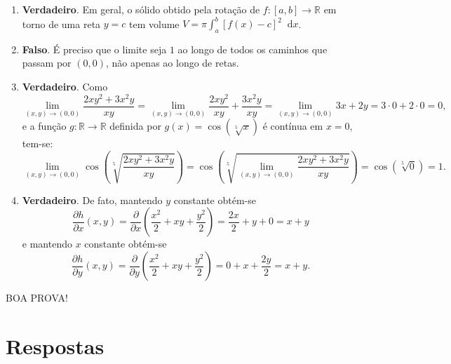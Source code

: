 \documentclass[12pt,a4paper]{article}
\newcommand*\diff{\mathop{}\!\mathrm{d}}
\begin{document}
\begin{ExerciseList}
\Answer \begin{enumerate}
\item \textbf{Verdadeiro}. Em geral, o sólido obtido pela rotação de $f:[a,b]\to\mathbb{R}$ em torno de uma reta $y = c$ tem volume $V = \pi \int_a^b \left[f(x)-c\right]^2 \diff{x}$.
\item \textbf{Falso}. É preciso que o limite seja $1$ ao longo de todos os caminhos que passam por $(0, 0)$, não apenas ao longo de retas.
\item \textbf{Verdadeiro}. Como
\[
\lim_{(x, y)\to(0, 0)} \frac{2xy^2 + 3x^2y}{xy}
= \lim_{(x, y)\to(0, 0)} \frac{2xy^2}{xy} + \frac{3x^2y}{xy}
= \lim_{(x, y)\to(0, 0)} 3x + 2y
= 3 \cdot 0 + 2 \cdot 0
= 0,
\]
e a função $g:\mathbb{R} \to \mathbb{R}$ definida por $g(x) = \cos\left(\sqrt[5]{x}\right)$ é contínua em $x = 0$, tem-se:
\[
\lim_{(x,y)\to(0,0)} \cos\left(\sqrt[5]{\frac{2xy^2+3x^2y}{xy}}\right)
= \cos\left(\sqrt[5]{ \lim_{(x,y)\to(0,0)} \frac{2xy^2+3x^2y}{xy}}\right)
= \cos\left(\sqrt[5]{0}\right)
= 1.
\]
\item \textbf{Verdadeiro}. De fato, mantendo $y$ constante obtém-se
\[
\frac{\partial h}{\partial x}(x, y)
= \frac{\partial}{\partial x}\left( \frac{x^2}{2} + xy + \frac{y^2}{2} \right)
= \frac{2x}{2} + y + 0
= x + y
\]
e mantendo $x$ constante obtém-se
\[
\frac{\partial h}{\partial y}(x, y)
= \frac{\partial}{\partial y}\left( \frac{x^2}{2} + xy + \frac{y^2}{2} \right)
= 0 + x + \frac{2y}{2}
= x + y.
\]
\end{enumerate}
\end{ExerciseList}

\begin{center}
BOA PROVA!
\end{center}

\newpage
\restoregeometry
\section*{Respostas}
\shipoutAnswer
\end{document}

